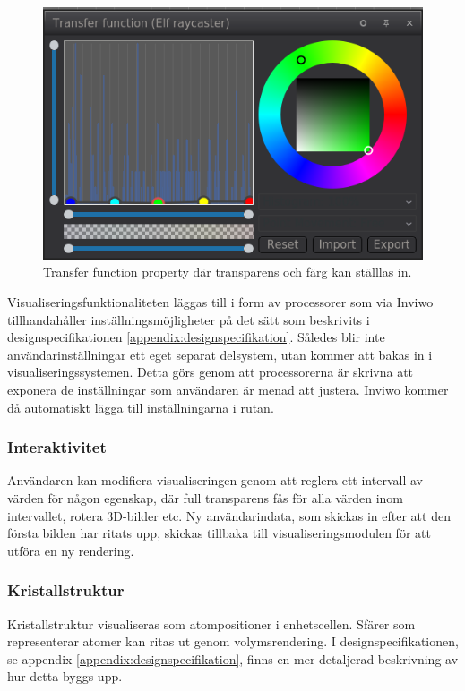 \documentclass[a4paper,12pt]{article}
\begin{document}
\begin{figure}[H]
	\centering
	\includegraphics[scale=0.55]{transferfunction_elf.png}
	\caption{Transfer function property där transparens och färg kan ställlas in.}
	\label{fig:transferfunction}
\end{figure}

Visualiseringsfunktionaliteten läggas till i form av processorer som via Inviwo tillhandahåller inställningsmöjligheter på det sätt som beskrivits i designspecifikationen \ref{appendix:designspecifikation}. Således blir inte användarinställningar ett eget separat delsystem, utan kommer att bakas in i visualiseringssystemen. Detta görs genom att processorerna är skrivna att exponera de inställningar som användaren är menad att
justera. Inviwo kommer då automatiskt lägga till inställningarna i rutan.

\subsubsection{Interaktivitet}
Användaren kan modifiera visualiseringen genom att reglera ett intervall av värden för
någon egenskap, där full transparens fås för alla värden inom intervallet, rotera 3D-bilder etc.
Ny användarindata, som skickas in efter att den första bilden har ritats upp, skickas tillbaka till
visualiseringsmodulen för att utföra en ny rendering. 

\subsubsection{Kristallstruktur}
Kristallstruktur visualiseras som atompositioner i enhetscellen. Sfärer som representerar atomer  kan  ritas  ut  genom  volymsrendering. %
I designspecifikationen, se appendix \ref{appendix:designspecifikation}, finns en mer detaljerad beskrivning av
hur detta byggs upp.
\end{document}
